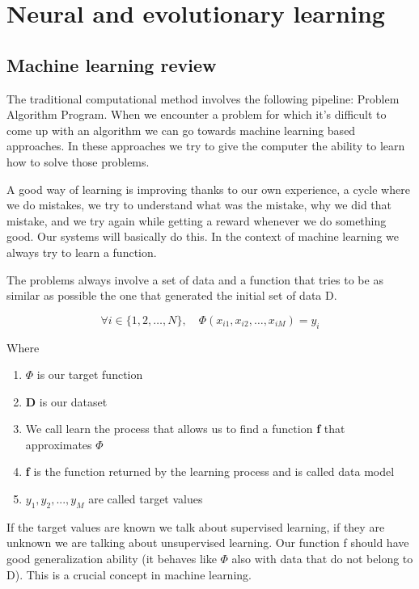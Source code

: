 \section{Neural and evolutionary learning}

\subsection{Machine learning review}


The traditional computational method involves the following pipeline: Problem \ra Algorithm \ra Program. When we encounter a problem for which it's difficult to come up with an algorithm we can go towards machine learning based approaches. In these approaches we try to give the computer the ability to learn how to solve those problems. 

\vspace{10pt}

A good way of learning is improving thanks to our own experience, a cycle where we do mistakes, we try to understand what was the mistake, why we did that mistake, and we try again while getting a reward whenever we do something good. Our systems will basically do this. In the context of machine learning we always try to learn a function.

\vspace{10pt}

The problems always involve a set of data and a function that tries to be as similar as possible the one that generated the initial set of data D. 

\[
\forall i \in \{1,2,\ldots,N\}, \quad
\Phi(x_{i1}, x_{i2}, \ldots, x_{iM}) = y_i
\]

Where

\begin{enumerate}
    \item \textbf{$\Phi$} \ra is our target function
    \item \textbf{D} \ra is our dataset
    \item We call learn the process that allows us to find a function \textbf{f} that approximates \textbf{$\Phi$}
    \item \textbf{f} \ra is the function returned by the learning process and is called data model
    \item \textbf{$y_1, y_2,..., y_M$} \ra are called target values
\end{enumerate}

If the target values are known we talk about supervised learning, if they are unknown we are talking about unsupervised learning. Our function f should have good generalization ability (it behaves like $\Phi$ also with data that do not belong to D). This is a crucial concept in machine learning. 

